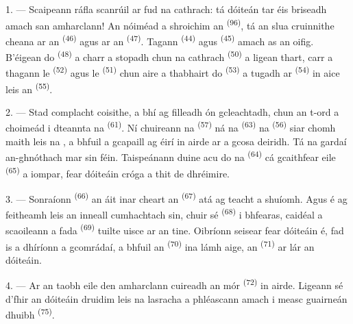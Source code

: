 \VUsaut{5.0mm}
\VUsaut{3.0mm}

\VUsaut{3.4mm}

1. --- Scaipeann ráfla scanrúil ar fud na cathrach: tá dóiteán tar éis briseadh amach
san amharclann! An nóiméad a shroichim an  \textsuperscript{(96)}, tá
an slua cruinnithe cheana ar an  \textsuperscript{(46)} agus ar an
 \textsuperscript{(47)}. Tagann 
\textsuperscript{(44)} agus  \textsuperscript{(45)} amach as an
oifig. B'éigean do  \textsuperscript{(48)} a charr a stopadh
chun  na cathrach \textsuperscript{(50)} a ligean thart, carr a
thagann le  \textsuperscript{(52)} agus le 
\textsuperscript{(51)} chun aire a thabhairt do 
\textsuperscript{(53)} a tugadh ar  \textsuperscript{(54)} in aice
leis an  \textsuperscript{(55)}.

2. --- Stad complacht coisithe, a bhí ag filleadh ón gcleachtadh, chun an t-ord a
choimeád i dteannta na 
\textsuperscript{(61)}. Ní chuireann na  \textsuperscript{(57)} ná
na  \textsuperscript{(63)} na 
\textsuperscript{(56)} siar chomh maith leis na , a bhfuil a
gcapaill ag éirí in airde ar a gcosa deiridh. Tá na gardaí an-ghnóthach mar sin féin.
Taispeánann duine acu do na  \textsuperscript{(64)} cá gcaithfear
 eile \textsuperscript{(65)} a iompar, fear dóiteáin cróga a thit
de dhréimire.

3. --- Sonraíonn  \textsuperscript{(66)} an áit inar cheart an
 \textsuperscript{(67)} atá ag teacht a shuíomh. Agus é ag
feitheamh leis an inneall cumhachtach sin, chuir sé 
\textsuperscript{(68)} i bhfearas, caidéal a scaoileann a  fada
\textsuperscript{(69)} tuilte uisce ar an tine. Oibríonn seisear fear dóiteáin é, fad
is a dhíríonn a gcomrádaí, a bhfuil an  \textsuperscript{(70)} ina lámh
aige, an  \textsuperscript{(71)} ar lár an dóiteáin.

4. --- Ar an taobh eile den amharclann cuireadh an  mór
\textsuperscript{(72)} in airde. Ligeann sé d'fhir an dóiteáin druidim leis na lasracha
a phléascann amach i measc guairneán  dhuibh \textsuperscript{(75)}.

